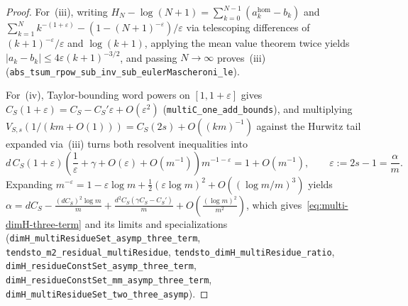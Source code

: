 \documentclass[11pt]{article}
\theoremstyle{definition}
\theoremstyle{remark}
\begin{document}
\begin{proof}
For~(iii), writing $H_N-\log(N+1)=\sum_{k=0}^{N-1}(a_k^{\mathrm{hom}}-b_k)$
and $\sum_{k=1}^N k^{-(1+\varepsilon)}-(1-(N+1)^{-\varepsilon})/\varepsilon$
via telescoping differences of $(k+1)^{-\varepsilon}/\varepsilon$ and
$\log(k+1)$, applying the mean value theorem twice yields $|a_k-b_k|\le 4\varepsilon(k+1)^{-3/2}$,
and passing $N\to\infty$ proves~\textup{(iii)}
(\texttt{abs\_\allowbreak tsum\_\allowbreak rpow\_\allowbreak sub\_\allowbreak inv\_\allowbreak sub\_\allowbreak eulerMascheroni\_\allowbreak le}).

For~(iv), Taylor-bounding word powers on $[1,1+\varepsilon]$ gives
$C_S(1+\varepsilon)=C_S-C_S'\varepsilon+O(\varepsilon^2)$
(\texttt{multiC\_\allowbreak one\_\allowbreak add\_\allowbreak bounds}), and
multiplying $V_{S,s}(1/(km+O(1)))=C_S(2s)+O((km)^{-1})$ against the Hurwitz
tail expanded via~\textup{(iii)} turns both resolvent inequalities into
\[
d\,C_S(1+\varepsilon)\left(\frac{1}{\varepsilon}+\gamma+O(\varepsilon)+O(m^{-1})\right)m^{-1-\varepsilon}=1+O(m^{-1}),\qquad \varepsilon:=2s-1=\frac{\alpha}{m}.
\]
Expanding $m^{-\varepsilon}=1-\varepsilon\log m+\frac12(\varepsilon\log m)^2+O((\log m/m)^3)$
yields $\alpha=dC_S-\frac{(dC_S)^2\log m}{m}+\frac{d^2C_S(\gamma C_S-C_S')}{m}+O\!\left(\frac{(\log m)^2}{m^2}\right)$,
which gives~\eqref{eq:multi-dimH-three-term} and its limits and specializations
(\texttt{dimH\_\allowbreak multiResidueSet\_\allowbreak asymp\_\allowbreak three\_\allowbreak term},
\texttt{tendsto\_\allowbreak m2\_\allowbreak residual\_\allowbreak multiResidue},
\texttt{tendsto\_\allowbreak dimH\_\allowbreak multiResidue\_\allowbreak ratio},
\texttt{dimH\_\allowbreak residueConstSet\_\allowbreak asymp\_\allowbreak three\_\allowbreak term},
\texttt{dimH\_\allowbreak residueConstSet\_\allowbreak mm\_\allowbreak asymp\_\allowbreak three\_\allowbreak term},
\texttt{dimH\_\allowbreak multiResidueSet\_\allowbreak two\_\allowbreak three\_\allowbreak asymp}).


\end{proof}
\end{document}
